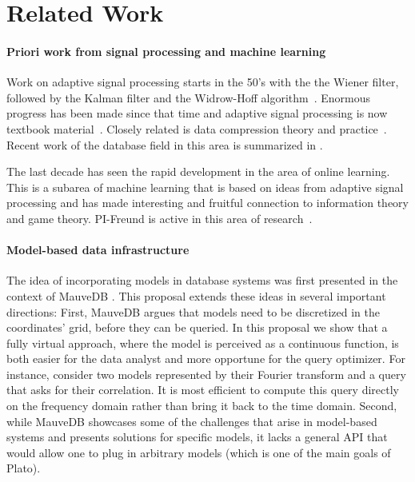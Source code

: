 \section{Related Work}

\paragraph{Priori work from signal processing and machine learning}
Work on adaptive signal processing starts in the 50's with the
the Wiener filter, followed by the Kalman filter and the Widrow-Hoff
algorithm~\cite{adaptive_signal_processing}. Enormous progress has
been made since that time and adaptive signal processing is now
textbook material~\cite{dsp,adaptive_filter_theory}. Closely related
is data compression theory and practice~\cite{DBLP:books/mk/Sayood12}.
Recent work of the database field in this area is summarized in \cite{DBS-004}.

The last decade has seen the rapid development in the area of online
learning. This is a subarea of machine learning that is based on ideas
from adaptive signal processing and has made interesting and fruitful
connection to information theory and game theory. PI-Freund is active
in this area of research~\cite{prediction_learning_models}.

\paragraph{Model-based data infrastructure}
The idea of incorporating models in database systems was first presented in the context of MauveDB \cite{mauvedb-grid, mauvedb-cidr, mauvedb-vldb}. This proposal extends these ideas in several important directions: First, MauveDB argues that models need to be discretized in the coordinates' grid, before they can be queried. In this proposal we show that a fully virtual approach, where the model is perceived as a continuous function, is both easier for the data analyst and more opportune for the query optimizer. For instance, consider two models represented by their Fourier transform and a query that asks for their correlation. It is most efficient to compute this query directly on the frequency domain rather than bring it back to the time domain. Second, while MauveDB showcases some of the challenges that arise in model-based systems and presents solutions for specific models, it lacks a general API that would allow one to plug in arbitrary models (which is one of the main goals of Plato). 

